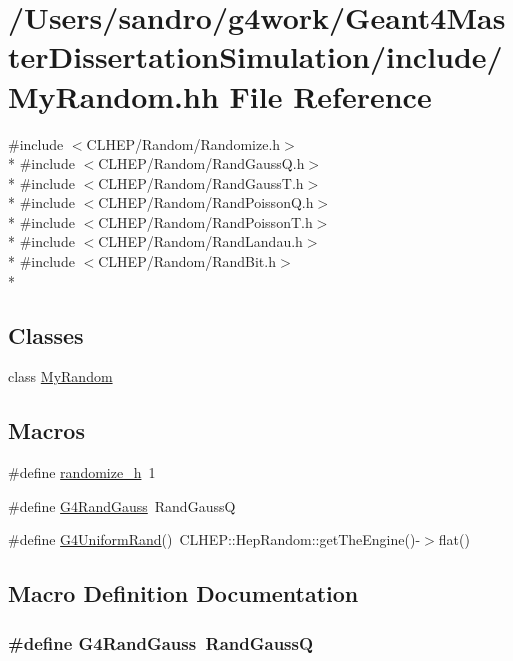 \hypertarget{_my_random_8hh}{\section{/\-Users/sandro/g4work/\-Geant4\-Master\-Dissertation\-Simulation/include/\-My\-Random.hh File Reference}
\label{_my_random_8hh}
}
{\ttfamily \#include $<$C\-L\-H\-E\-P/\-Random/\-Randomize.\-h$>$}\\*
{\ttfamily \#include $<$C\-L\-H\-E\-P/\-Random/\-Rand\-Gauss\-Q.\-h$>$}\\*
{\ttfamily \#include $<$C\-L\-H\-E\-P/\-Random/\-Rand\-Gauss\-T.\-h$>$}\\*
{\ttfamily \#include $<$C\-L\-H\-E\-P/\-Random/\-Rand\-Poisson\-Q.\-h$>$}\\*
{\ttfamily \#include $<$C\-L\-H\-E\-P/\-Random/\-Rand\-Poisson\-T.\-h$>$}\\*
{\ttfamily \#include $<$C\-L\-H\-E\-P/\-Random/\-Rand\-Landau.\-h$>$}\\*
{\ttfamily \#include $<$C\-L\-H\-E\-P/\-Random/\-Rand\-Bit.\-h$>$}\\*
\subsection*{Classes}
\begin{DoxyCompactItemize}
\item 
class \hyperlink{class_my_random}{My\-Random}
\end{DoxyCompactItemize}
\subsection*{Macros}
\begin{DoxyCompactItemize}
\item 
\#define \hyperlink{_my_random_8hh_a1b2012ef5db9d6dfc92420509fd83fb8}{randomize\-\_\-h}~1
\item 
\#define \hyperlink{_my_random_8hh_a4907d9fc84e60e1c93d844b250718478}{G4\-Rand\-Gauss}~Rand\-Gauss\-Q
\item 
\#define \hyperlink{_my_random_8hh_a292914b2bf82aa2222afdd57c39609d1}{G4\-Uniform\-Rand}()~C\-L\-H\-E\-P\-::\-Hep\-Random\-::get\-The\-Engine()-\/$>$flat()
\end{DoxyCompactItemize}


\subsection{Macro Definition Documentation}
\hypertarget{_my_random_8hh_a4907d9fc84e60e1c93d844b250718478}{
\subsubsection[{G4\-Rand\-Gauss}]{\setlength{\rightskip}{0pt plus 5cm}\#define G4\-Rand\-Gauss~Rand\-Gauss\-Q}}\label{_my_random_8hh_a4907d9fc84e60e1c93d844b250718478}



